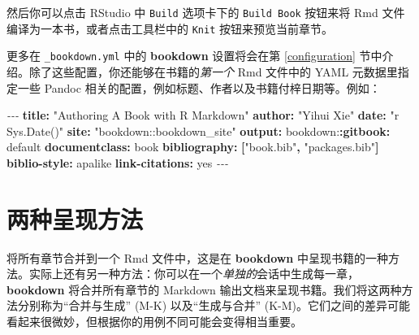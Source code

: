 \documentclass[
  12pt,
]{krantz}
\newenvironment{Shaded}{\begin{snugshade}}{\end{snugshade}}
\newcommand{\AttributeTok}[1]{\textcolor[rgb]{0.13,0.29,0.53}{#1}}
\newcommand{\CharTok}[1]{\textcolor[rgb]{0.31,0.60,0.02}{#1}}
\newcommand{\FunctionTok}[1]{\textcolor[rgb]{0.13,0.29,0.53}{\textbf{#1}}}
\newcommand{\KeywordTok}[1]{\textcolor[rgb]{0.13,0.29,0.53}{\textbf{#1}}}
\newcommand{\PreprocessorTok}[1]{\textcolor[rgb]{0.56,0.35,0.01}{\textit{#1}}}
\newcommand{\StringTok}[1]{\textcolor[rgb]{0.31,0.60,0.02}{#1}}
\theoremstyle{definition}
\theoremstyle{definition}
\theoremstyle{definition}
\theoremstyle{definition}
\theoremstyle{remark}
\begin{document}
然后你可以点击 RStudio 中 \texttt{Build} 选项卡下的 \texttt{Build\ Book} 按钮来将 Rmd 文件编译为一本书，或者点击工具栏中的 \texttt{Knit} 按钮来预览当前章节。

更多在 \texttt{\_bookdown.yml} 中的 \textbf{bookdown} 设置将会在第 \ref{configuration} 节中介绍。除了这些配置，你还能够在书籍的\emph{第一个} Rmd 文件中的 YAML 元数据里指定一些 Pandoc 相关的配置，例如标题、作者以及书籍付梓日期等。例如：

\begin{Shaded}
\begin{Highlighting}[]
\PreprocessorTok{{-}{-}{-} }
\FunctionTok{title}\KeywordTok{:}\AttributeTok{ }\StringTok{"Authoring A Book with R Markdown"}
\FunctionTok{author}\KeywordTok{:}\AttributeTok{ }\StringTok{"Yihui Xie"}
\FunctionTok{date}\KeywordTok{:}\AttributeTok{ }\StringTok{"\textasciigrave{}r Sys.Date()\textasciigrave{}"}
\FunctionTok{site}\KeywordTok{:}\AttributeTok{ }\StringTok{"bookdown::bookdown\_site"}
\FunctionTok{output}\KeywordTok{:}
\AttributeTok{  bookdown:}\FunctionTok{:gitbook}\KeywordTok{:}\AttributeTok{ default}
\FunctionTok{documentclass}\KeywordTok{:}\AttributeTok{ book}
\FunctionTok{bibliography}\KeywordTok{:}\AttributeTok{ }\KeywordTok{[}\StringTok{"book.bib"}\KeywordTok{,}\AttributeTok{ }\StringTok{"packages.bib"}\KeywordTok{]}
\FunctionTok{biblio{-}style}\KeywordTok{:}\AttributeTok{ apalike}
\FunctionTok{link{-}citations}\KeywordTok{:}\AttributeTok{ }\CharTok{yes}
\PreprocessorTok{{-}{-}{-}}
\end{Highlighting}
\end{Shaded}

\hypertarget{new-session}{%
\section{两种呈现方法}\label{new-session}}

将所有章节合并到一个 Rmd 文件中，这是在 \textbf{bookdown} 中呈现书籍的一种方法。实际上还有另一种方法：你可以在一个\emph{单独的}会话中生成每一章，\textbf{bookdown} 将合并所有章节的 Markdown 输出文档来呈现书籍。我们将这两种方法分别称为``合并与生成'' (M-K) 以及``生成与合并'' (K-M)。它们之间的差异可能看起来很微妙，但根据你的用例不同可能会变得相当重要。
\end{document}
